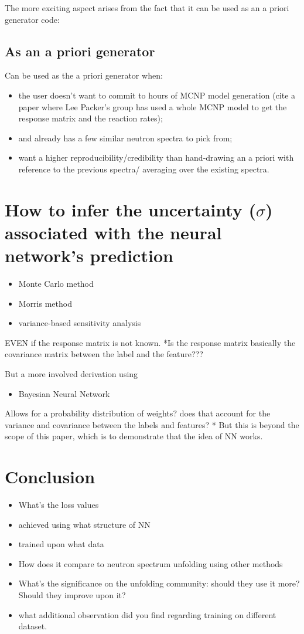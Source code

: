 \documentclass[a4paper, 12pt]{article}
\begin{document}
The more exciting aspect arises from the fact that it can be used as an a priori generator code:
\subsection{As an a priori generator}
Can be used as the a priori generator when:
\begin{itemize}
    \item the user doesn't want to commit to hours of MCNP model generation (cite a paper where Lee Packer's group has used a whole MCNP model to get the response matrix and the reaction rates);
    \item and already has a few similar neutron spectra to pick from;
    \item want a higher reproducibility/credibility than hand-drawing an a priori with reference to the previous spectra/ averaging over the existing spectra.
\end{itemize}


\section{How to infer the uncertainty ($\sigma$) associated with the neural network's prediction}
\begin{itemize}
    \item Monte Carlo method
    \item Morris method
    \item variance-based sensitivity analysis
\end{itemize}
EVEN if the response matrix is not known.
*Is the response matrix basically the covariance matrix between the label and the feature???

But a more involved derivation using 
\begin{itemize}
    \item Bayesian Neural Network
\end{itemize}
Allows for a probability distribution of weights? does that account for the variance and covariance between the labels and features? *
But this is beyond the scope of this paper, which is to demonstrate that the idea of NN works.

\section{Conclusion}
\begin{itemize}
    \item What's the loss values
    \item achieved using what structure of NN
    \item trained upon what data
    \item How does it compare to neutron spectrum unfolding using other methods
    \item What's the significance on the unfolding community: should they use it more? Should they improve upon it?
    \item what additional observation did you find regarding training on different dataset.
\end{itemize}
\end{document}
